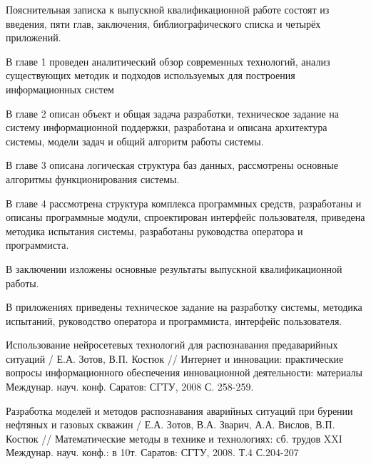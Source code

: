 \documentclass[a4paper,13pt]{article}
\begin{document}
Пояснительная записка к выпускной квалификационной работе состоят из введения, пяти глав, заключения, библиографического списка и четырёх приложений.

В главе 1 проведен аналитический обзор современных технологий, анализ существующих методик и подходов используемых для построения информационных систем

В главе 2 описан объект и общая задача разработки, техническое задание на систему информационной поддержки, разработана и описана архитектура системы, модели задач и общий алгоритм работы системы.

В главе 3 описана  логическая структура баз данных, рассмотрены основные алгоритмы функционирования системы.

В главе 4 рассмотрена структура комплекса программных средств, разработаны и описаны программные модули, спроектирован интерфейс пользователя,  приведена методика испытания системы, разработаны руководства оператора и программиста.

В заключении изложены основные результаты выпускной квалификационной работы.

В приложениях приведены техническое задание на разработку системы, методика испытаний, руководство оператора и программиста, интерфейс пользователя.
\begin{thebibliography}{2}
Использование нейросетевых технологий для распознавания предаварийных ситуаций / Е.А. Зотов, В.П. Костюк // Интернет и инновации: практические вопросы информационного обеспечения инновационной деятельности: материалы Междунар. науч. конф. Саратов: СГТУ, 2008 С. 258-259.

 Разработка моделей и методов распознавания аварийных ситуаций при бурении нефтяных и газовых скважин / Е.А. Зотов, В.А. Зварич, А.А. Вислов, В.П. Костюк // Математические методы в технике и технологиях: сб. трудов XXI Междунар. науч. конф.: в 10т. Саратов: СГТУ, 2008. Т.4 С.204-207
\end{thebibliography}
\end{document}
